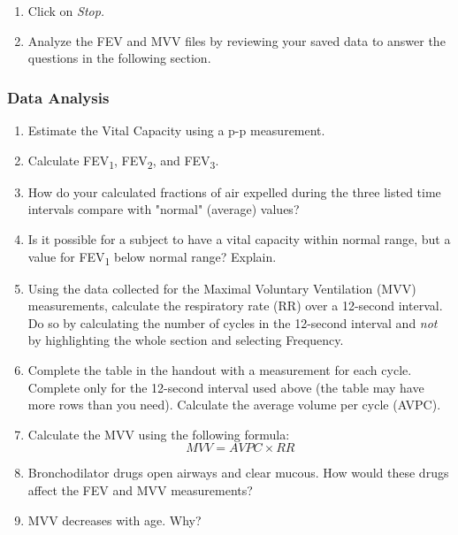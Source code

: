 \documentclass{article}
\begin{document}
\begin{enumerate}
	\item Click on \textit{Stop.}
	\item Analyze the FEV and MVV files by reviewing your saved data to answer the questions in the following section.
\end{enumerate}

\subsubsection*{Data Analysis}
\begin{enumerate}
	\item Estimate the Vital Capacity using a p-p measurement.
	\item Calculate FEV\textsubscript{1}, FEV\textsubscript{2}, and FEV\textsubscript{3}.
	\item How do your calculated fractions of air expelled during the three listed time intervals compare with "normal" (average) values?
	\item Is it possible for a subject to have a vital capacity within normal range, but a value for FEV\textsubscript{1} below normal range? Explain.
	\item Using the data collected for the Maximal Voluntary Ventilation (MVV) measurements, calculate the respiratory rate (RR) over a 12-second interval. Do so by calculating the number of cycles in the 12-second interval and \textit{not} by highlighting the whole section and selecting Frequency.
	\item Complete the table in the handout with a measurement for each cycle. Complete only for the 12-second interval used above (the table may have more rows than you need). Calculate the average volume per cycle (AVPC).
	\item Calculate the MVV using the following formula:\begin{equation}
		MVV = AVPC \times RR
	\end{equation}
	
	\item Bronchodilator drugs open airways and clear mucous. How would these drugs affect the FEV and MVV measurements?
	\item MVV decreases with age. Why?
\end{enumerate}
\end{document}

